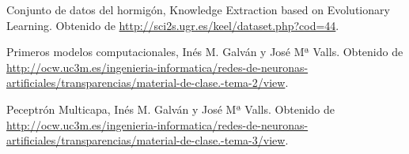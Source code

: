 \documentclass[11pt,spanish,listoffigures,listoftables]{tfgetsinf}
\begin{document}
\begin{thebibliography}{10}


   Conjunto de datos del hormigón, 
   \newblock Knowledge Extraction based on Evolutionary Learning. 
   \newblock Obtenido de
   \url{http://sci2s.ugr.es/keel/dataset.php?cod=44}.

   Primeros modelos computacionales, 
   \newblock Inés M. Galván y José Mª Valls.
   \newblock Obtenido de
   \url{http://ocw.uc3m.es/ingenieria-informatica/redes-de-neuronas-artificiales/transparencias/material-de-clase.-tema-2/view}.

   Peceptrón Multicapa, 
   \newblock Inés M. Galván y José Mª Valls.
   \newblock Obtenido de
   \url{http://ocw.uc3m.es/ingenieria-informatica/redes-de-neuronas-artificiales/transparencias/material-de-clase.-tema-3/view}.

\end{thebibliography}
\cleardoublepage

\end{document}

